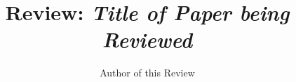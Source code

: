 \documentclass{article}
\begin{document}
\title{Review: \emph{Title of Paper being Reviewed}}
\author{Author of this Review}

\maketitle




\end{document}
